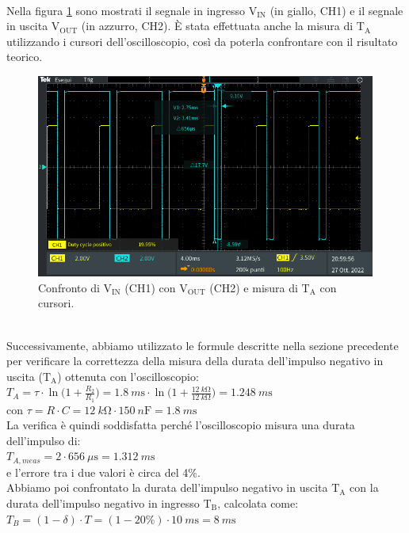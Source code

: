 \documentclass{report}
\begin{document}
\\Nella figura \ref{figura:TEK00002} sono mostrati il segnale in ingresso $\mathrm{V_{IN}}$ (in giallo, CH1) e il segnale in uscita $\mathrm{V_{OUT}}$ (in azzurro, CH2). \`E stata effettuata anche la misura di $\mathrm{T_A}$ utilizzando i cursori dell'oscilloscopio, così da poterla confrontare con il risultato teorico.
\begin{figure}[h!]
	\centering
	\includegraphics[height=6.7cm]{immagini/TEK00002}
	\caption{Confronto di $\mathrm{V_{IN}}$ (CH1) con $\mathrm{V_{OUT}}$ (CH2) e misura di $\mathrm{T_A}$ con cursori.}
	\label{figura:TEK00002}
\end{figure}
\\Successivamente, abbiamo utilizzato le formule descritte nella sezione precedente per verificare la correttezza della misura della durata dell'impulso negativo in uscita ($\mathrm{T_A}$) ottenuta con l'oscilloscopio:
\\[4pt]\indent$\displaystyle{T_A=\tau\cdot\ln\biggl(1+\frac{R_2}{R_1}\biggr)=\SI{1.8}{m\second}\cdot\ln\biggl(1+\frac{\SI{12}{k\ohm}}{\SI{12}{k\ohm}}\biggr)=\SI{1.248}{m\second}}$
\\[4pt]\indent con $\displaystyle{\tau=R \cdot C=\SI{12}{k\ohm}\cdot\SI{150}{n\farad}=\SI{1.8}{m\second}}$
\\[4pt]La verifica è quindi soddisfatta perché l'oscilloscopio misura una durata dell'impulso di: 
\\\indent$\displaystyle{T_{A,meas}=2\cdot\SI{656}{\mu\second}=\SI{1.312}{m\second}}$
\\ e l'errore tra i due valori è circa del 4\%. 
\\ Abbiamo poi confrontato la durata dell'impulso negativo in uscita $\mathrm{T_A}$ con la durata dell'impulso negativo in ingresso $\mathrm{T_B}$, calcolata come:
\\[4pt]\indent$\displaystyle{T_B=(1-\delta)\cdot T=(1-20\%)\cdot\SI{10}{m\second}=\SI{8}{m\second}}$
\end{document}
